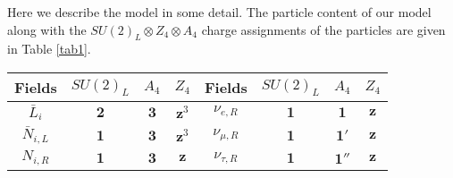 \documentclass[english,10pt,aps,prd,a4paper,preprintnumbers,floatfix,nofootinbib,showpacs,superscriptaddress]{revtex4-1}
\begin{document}
Here we describe the model in some detail.  The particle content of
our model along with the $SU(2)_L \otimes Z_4 \otimes A_4$ charge
assignments of the particles are given in Table \ref{tab1}.
%
\begin{table}[ht]
\begin{center}
\begin{tabular}{c c c c || c c c c}
  \hline \hline
Fields          \hspace{1cm}    & $SU(2)_L$           \hspace{1cm}   & $A_4$           \hspace{1cm}   &  $Z_4$	    \hspace{1cm}    & Fields          \hspace{1cm}    & $SU(2)_L$           \hspace{1cm}   & $A_4$           \hspace{1cm}   &  $Z_4$	     \\
\hline \hline
$\bar{L}_i$     \hspace{1cm}    & $\mathbf{2}$    \hspace{1cm}    & $\mathbf{3}$    \hspace{1cm}   &  $\mathbf{z}^3$   \hspace{1cm}   &		
$\nu_{e,R}$     \hspace{1cm}    & $\mathbf{1}$    \hspace{1cm}    & $\mathbf{1}$    \hspace{1cm}   &  $\mathbf{z}$      \\
$\bar{N}_{i,L}$ \hspace{1cm}    & $\mathbf{1}$    \hspace{1cm}    & $\mathbf{3}$    \hspace{1cm}   &  $\mathbf{z}^3$   \hspace{1cm}   &        
$\nu_{\mu, R}$  \hspace{1cm}    & $\mathbf{1}$    \hspace{1cm}    & $\mathbf{1'}$   \hspace{1cm}   &  $\mathbf{z}$       \\
$N_{i,R}$       \hspace{1cm}    & $\mathbf{1}$    \hspace{1cm}    & $\mathbf{3}$    \hspace{1cm}   &  $\mathbf{z}$      \hspace{1cm}  &		
$ \nu_{\tau,R}$ \hspace{1cm}    & $\mathbf{1}$    \hspace{1cm}    & $\mathbf{1''}$  \hspace{1cm}   &  $\mathbf{z}$        \\

\end{tabular}
\end{center}
\end{table}
\end{document}

